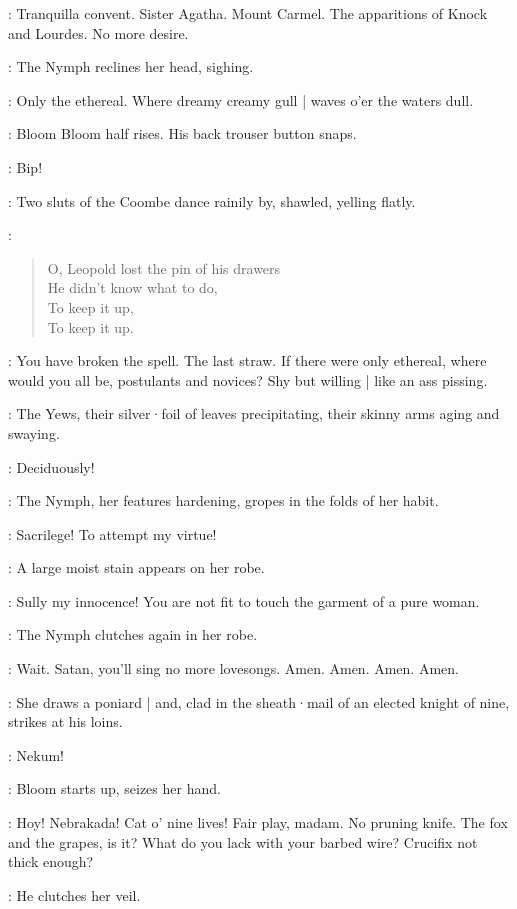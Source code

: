 \Nymph:
Tranquilla convent.
Sister Agatha.
Mount Carmel.
The apparitions of Knock and Lourdes.
No more desire.

:
The Nymph reclines her head,
sighing.

\Nymph:
Only the ethereal.
Where dreamy creamy gull |
waves o'er the waters dull.

:
Bloom Bloom half rises.
His back trouser button snaps.

\Button:
Bip!

:
Two sluts of the Coombe dance rainily by,
shawled,
yelling flatly.

\Sluts:
\begin{verse}
    O, Leopold lost the pin of his drawers\\
    He didn't know what to do,\\
    To keep it up,\\
    To keep it up.
\end{verse}

\Bloom:
You have broken the spell.
The last straw.
If there were only ethereal,
where would you all be,
postulants and novices?
%
Shy but willing |
like an ass pissing.

:
The Yews,
their silver·foil of leaves precipitating,
their skinny arms aging and swaying.

\Yews:
Deciduously!

:
The Nymph,
her features hardening,
gropes in the folds of her habit.

\Nymph:
Sacrilege!
To attempt my virtue!

:
A large moist stain appears on her robe.

\Nymph:
Sully my innocence!
You are not fit to touch the garment of a pure woman.

:
The Nymph clutches again in her robe.

\Nymph:
Wait.
Satan,
you'll sing no more lovesongs.
Amen. Amen. Amen. Amen.

:
She draws a poniard |
and,
clad in the sheath·mail of an elected knight of nine,
strikes at his loins.

\Nymph:
Nekum!

:
Bloom starts up,
seizes her hand.

\Bloom:
Hoy!
Nebrakada!
Cat o' nine lives!
Fair play,
madam.
No pruning knife.
The fox and the grapes,
is it?
What do you lack with your barbed wire?
Crucifix not thick enough?

:
He clutches her veil.

